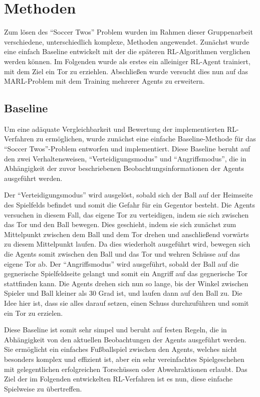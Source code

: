 \chapter{Methoden} \label{chapter:2}

Zum lösen des ``Soccer Twos'' Problem wurden im Rahmen dieser Gruppenarbeit verschiedene, unterschiedlich komplexe, Methoden angewendet. Zunächst wurde eine einfach Baseline entwickelt mit der die späteren \ac{RL}-Algorithmen verglichen werden können. Im Folgenden wurde als erstes ein alleiniger \ac{RL}-Agent trainiert, mit dem Ziel ein Tor zu erziehlen. Abschließen wurde versucht dies nun auf das \ac{MARL}-Problem mit dem Training mehrerer Agents zu erweitern. %

\section{Baseline}

Um eine adäquate Vergleichbarkeit und Bewertung der implementierten \ac{RL}-Verfahren zu ermöglichen, wurde zunächst eine einfache Baseline-Methode für das ``Soccer Twos''-Problem entworfen und implementiert. Diese Baseline beruht auf den zwei Verhaltensweisen, ``Verteidigungsmodus'' und ``Angriffsmodus'', die in Abhängigkeit der zuvor beschriebenen Beobachtungsinformationen der Agents ausgeführt werden.

Der ``Verteidigungsmodus'' wird ausgelöst, sobald sich der Ball auf der Heimseite des Spielfelds befindet und somit die Gefahr für ein Gegentor besteht. Die Agents versuchen in diesem Fall, das eigene Tor zu verteidigen, indem sie sich zwischen das Tor und den Ball bewegen. Dies geschieht, indem sie sich zunächst zum Mittelpunkt zwischen dem Ball und dem Tor drehen und anschließend vorwärts zu diesem Mittelpunkt laufen. Da dies wiederholt ausgeführt wird, bewegen sich die Agents somit zwischen den Ball und das Tor und wehren Schüsse auf das eigene Tor ab.
Der ``Angriffsmodus'' wird ausgeführt, sobald der Ball auf die gegnerische Spielfeldseite gelangt und somit ein Angriff auf das gegnerische Tor stattfinden kann. Die Agents drehen sich nun so lange, bis der Winkel zwischen Spieler und Ball kleiner als 30 Grad ist, und laufen dann auf den Ball zu. Die Idee hier ist, dass sie alles darauf setzen, einen Schuss durchzuführen und somit ein Tor zu erzielen.

Diese Baseline ist somit sehr simpel und beruht auf festen Regeln, die in Abhängigkeit von den aktuellen Beobachtungen der Agents ausgeführt werden. Sie ermöglicht ein einfaches Fußballspiel zwischen den Agents, welches nicht besonders komplex und effizient ist, aber ein sehr vereinfachtes Spielgeschehen mit gelegentlichen erfolgreichen Torschüssen oder Abwehraktionen erlaubt. Das Ziel der im Folgenden entwickelten \ac{RL}-Verfahren ist es nun, diese einfache Spielweise zu übertreffen.


